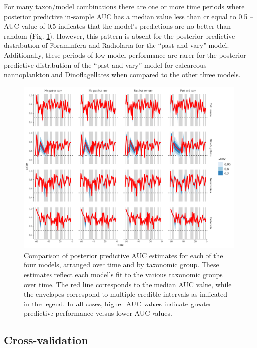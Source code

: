 \documentclass[12pt,letterpaper]{article}
\begin{document}
For many taxon/model combinations there are one or more time periods where posterior predictive in-sample AUC has a median value less than or equal to 0.5 -- AUC value of 0.5 indicates that the model's predictions are no better than random (Fig. \ref{fig:auc_taxon_time}). However, this pattern is absent for the posterior predictive distribution of Foraminfera and Radiolaria for the ``past and vary'' model. Additionally, these periods of low model performance are rarer for the posterior predictive distribution of the ``past and vary'' model for calcareous nannoplankton and Dinoflagellates when compared to the other three models.
\begin{figure}[ht]
  \centering
  \includegraphics[width=\textwidth,height=0.5\textheight,keepaspectratio=true]{../results/figure/auc_taxon_time}
  \caption{Comparison of posterior predictive AUC estimates for each of the four models, arranged over time and by taxonomic group. These estimates reflect each model's fit to the various taxonomic groups over time. The red line corresponds to the median AUC value, while the envelopes correspond to multiple credible intervals as indicated in the legend. In all cases, higher AUC values indicate greater predictive performance versus lower AUC values.}
  \label{fig:auc_taxon_time}
\end{figure}




\subsection{Cross-validation}
\end{document}
